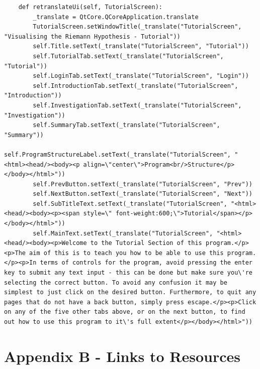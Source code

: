 \documentclass{article}
\begin{document}
\begin{lstlisting}
    def retranslateUi(self, TutorialScreen):
        _translate = QtCore.QCoreApplication.translate
        TutorialScreen.setWindowTitle(_translate("TutorialScreen", "Visualising the Riemann Hypothesis - Tutorial"))
        self.Title.setText(_translate("TutorialScreen", "Tutorial"))
        self.TutorialTab.setText(_translate("TutorialScreen", "Tutorial"))
        self.LoginTab.setText(_translate("TutorialScreen", "Login"))
        self.IntroductionTab.setText(_translate("TutorialScreen", "Introduction"))
        self.InvestigationTab.setText(_translate("TutorialScreen", "Investigation"))
        self.SummaryTab.setText(_translate("TutorialScreen", "Summary"))
        self.ProgramStructureLabel.setText(_translate("TutorialScreen", "<html><head/><body><p align=\"center\">Program<br/>Structure</p></body></html>"))
        self.PrevButton.setText(_translate("TutorialScreen", "Prev"))
        self.NextButton.setText(_translate("TutorialScreen", "Next"))
        self.SubTitleText.setText(_translate("TutorialScreen", "<html><head/><body><p><span style=\" font-weight:600;\">Tutorial</span></p></body></html>"))
        self.MainText.setText(_translate("TutorialScreen", "<html><head/><body><p>Welcome to the Tutorial Section of this program.</p><p>The aim of this is to teach you how to be able to use this program.</p><p>In terms of controls for the program, avoid pressing the enter key to submit any text input - this can be done but make sure you\'re selecting the correct button. To avoid any confusion it may be simplest to just click on the desired button. Furthermore, to quit any pages that do not have a back button, simply press escape.</p><p>Click on any of the five other tabs above, or on the next button, to find out how to use this program to it\'s full extent</p></body></html>"))
\end{lstlisting}


\clearpage
\section{Appendix B - Links to Resources}
\end{document}
